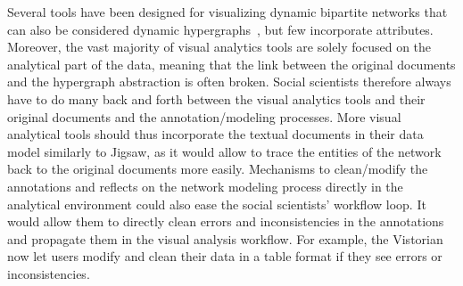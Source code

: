 


Several tools have been designed for visualizing dynamic bipartite networks that can also be considered dynamic hypergraphs~\cite{valdiviaAnalyzingDynamicHypergraphs2021, hyperstorylines}, but few incorporate attributes.
Moreover, the vast majority of visual analytics tools are solely focused on the analytical part of the data, meaning that the link between the original documents and the hypergraph abstraction is often broken.
Social scientists therefore always have to do many back and forth between the visual analytics tools and their original documents and the annotation/modeling processes.
More visual analytical tools should thus incorporate the textual documents in their data model similarly to Jigsaw\cite{Stasko}, as it would allow to trace the entities of the network back to the original documents more easily.
Mechanisms to clean/modify the annotations and reflects on the network modeling process directly in the analytical environment could also ease the social scientists' workflow loop.
It would allow them to directly clean errors and inconsistencies in the annotations and propagate them in the visual analysis workflow.
For example, the Vistorian\cite{vistorian_mini_questionnaires} now let users modify and clean their data in a table format if they see errors or inconsistencies.


